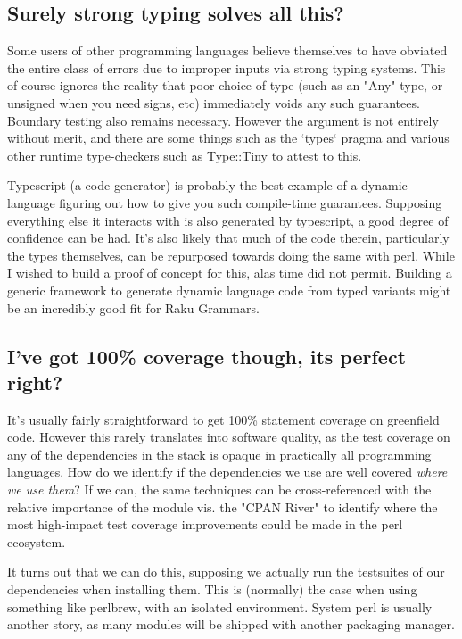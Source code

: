\documentclass{article}
\begin{document}
\subsection{Surely strong typing solves all this?}

Some users of other programming languages believe themselves to have obviated the entire class of errors due to improper inputs via strong typing systems.
This of course ignores the reality that poor choice of type (such as an "Any" type, or unsigned when you need signs, etc) immediately voids any such guarantees.
Boundary testing also remains necessary.
However the argument is not entirely without merit, and there are some things such as the `types` pragma and various other runtime type-checkers such as Type::Tiny to attest to this.

Typescript (a code generator) is probably the best example of a dynamic language figuring out how to give you such compile-time guarantees.
Supposing everything else it interacts with is also generated by typescript, a good degree of confidence can be had.
It's also likely that much of the code therein, particularly the types themselves, can be repurposed towards doing the same with perl.
While I wished to build a proof of concept for this, alas time did not permit.
Building a generic framework to generate dynamic language code from typed variants might be an incredibly good fit for Raku Grammars.

\subsection{I've got 100\% coverage though, its perfect right?}

It's usually fairly straightforward to get 100\% statement coverage on greenfield code.
However this rarely translates into software quality, as the test coverage on any of the dependencies in the stack is opaque in practically all programming languages.
How do we identify if the dependencies we use are well covered \textit{where we use them}?
If we can, the same techniques can be cross-referenced with the relative importance of the module vis. the "CPAN River" to identify where the most high-impact test coverage improvements could be made in the perl ecosystem.

It turns out that we can do this, supposing we actually run the testsuites of our dependencies when installing them.
This is (normally) the case when using something like perlbrew, with an isolated environment.
System perl is usually another story, as many modules will be shipped with another packaging manager.
\end{document}
